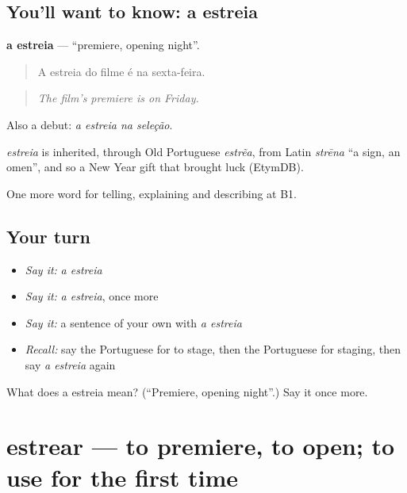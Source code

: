 \subsection*{You'll want to know: a estreia}
\textbf{a estreia} — \textquotedblleft{}premiere, opening night\textquotedblright{}.

\begin{quote}
A estreia do filme é na sexta-feira.
\end{quote}

\begin{quote}
\emph{The film's premiere is on Friday.}
\end{quote}

Also a debut: \emph{a estreia na seleção}.

\begin{cousinweb}
\emph{estreia} is inherited, through Old Portuguese \emph{estrẽa}, from Latin \emph{strēna} \textquotedblleft{}a sign, an omen\textquotedblright{}, and so a New Year gift that brought luck (EtymDB).
\end{cousinweb}

\begin{grammarlens}[title={What you've built}]
One more word for telling, explaining and describing at B1.
\end{grammarlens}

\subsection*{Your turn}
\begin{itemize}
\raggedright
  \item \emph{Say it:} \emph{a estreia}
  \item \emph{Say it:} \emph{a estreia}, once more
  \item \emph{Say it:} a sentence of your own with \emph{a estreia}
  \item \emph{Recall:} say the Portuguese for to stage, then the Portuguese for staging, then say \emph{a estreia} again
\end{itemize}

\begin{tcolorbox}[breakable,colback=teal!4,colframe=teal!35!black,title={Before you move on}]
What does a estreia mean? (\textquotedblleft{}Premiere, opening night\textquotedblright{}.) Say it once more.
\end{tcolorbox}
\section[estrear]{estrear — to premiere, to open; to use for the first time}

